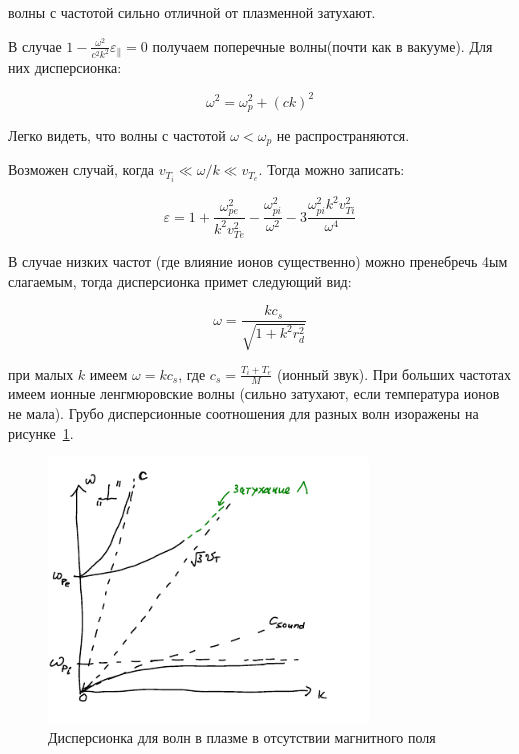 \documentclass[10pt, a4paper]{article}
\begin{document}
волны с частотой сильно отличной от плазменной затухают.

В случае $1 - \frac{\omega^2}{c^2 k^2} \varepsilon_{\parallel}=0$ получаем поперечные волны(почти как в вакууме). Для них
дисперсионка:

\begin{equation}
    \omega^2=\omega_p^2 + (c k)^2
\end{equation}

Легко видеть, что волны с частотой $\omega < \omega_p$ не распространяются.

Возможен случай, когда $v_{T_i} \ll \omega/k \ll v_{T_e}$. Тогда можно записать:

\begin{equation}
    \varepsilon=1+\frac{\omega_{pe}^2}{k^2 v_{Te}^2} - \frac{\omega_{pi}^2}{\omega^2}-3\frac{\omega_{pi}^2 k^2 v_{Ti}^2}{\omega^4}
\end{equation}

В случае низких частот (где влияние ионов существенно) можно пренебречь 4ым слагаемым, тогда дисперсионка примет следующий вид:

\begin{equation}
    \omega=\frac{k c_s}{\sqrt{1 + k^2 r_d^2}}
\end{equation}

при малых $k$ имеем $\omega=k c_s$, где $c_s=\frac{T_i + T_e}{M}$ (ионный звук). При больших частотах имеем ионные ленгмюровские волны (сильно затухают, если температура ионов не мала). Грубо дисперсионные соотношения для разных волн изоражены на рисунке~\ref{fig:disp_eq_without_B}.

\begin{figure}[h!]
	\begin{center}
		\includegraphics[width=85mm]{noB.pdf}
	\end{center}
	\caption{Дисперсионка для волн в плазме в отсутствии магнитного поля}
	\label{fig:disp_eq_without_B} 
\end{figure}
\end{document}
